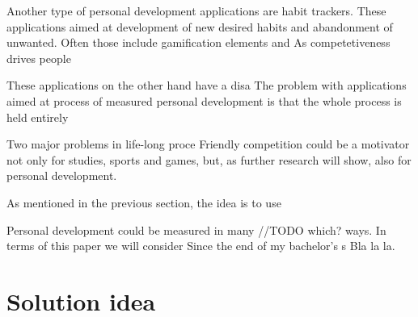 Another type of personal development applications are habit trackers.
These applications aimed at development of new desired habits and abandonment of unwanted.
Often those include gamification elements and
As competetiveness drives people

These applications on the other hand have a disa
The problem with applications aimed at process of measured personal development is that the whole process is held entirely



Two major problems in life-long proce
Friendly competition could be a motivator not only for studies, sports and games, but, as further research will show,
also for personal development.


As mentioned in the previous section, the idea is to use

Personal development could be measured in many {\color{blue}//TODO which?} ways.
In terms of this paper we will consider
Since the end of my bachelor's s
Bla la la.

\section{Solution idea}\label{sec:solution-idea}
